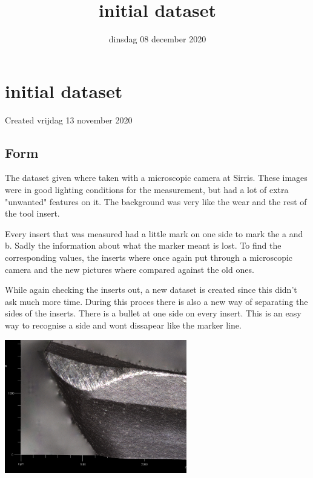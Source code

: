 \documentclass{scrartcl}
\title{initial dataset}
\date{dinsdag 08 december 2020}
\author{}
\begin{document}
\maketitle

		\section{initial dataset}

Created vrijdag 13 november 2020



\subsection{Form}

The dataset given where taken with a microscopic camera at Sirris. These images were in good lighting conditions for the measurement, but had a lot of extra "unwanted" features on it. The background was very like the wear and the rest of the tool insert. 

Every insert that was measured had a little mark on one side to mark the a and b. Sadly the information about what the marker meant is lost. To find the corresponding values, the inserts where once again put through a microscopic camera and the new pictures where compared against the old ones. 



While again checking the inserts out, a new dataset is created since this didn't ask much more time. During this proces there is also a new way of separating the sides of the inserts. There is a bullet at one side on every insert. This is an easy way to recognise a side and wont dissapear like the marker line. 







\includegraphics[width=3.125000in, keepaspectratio=true]{./initial_dataset/initial dataset pictuer.PNG}
\end{document}
